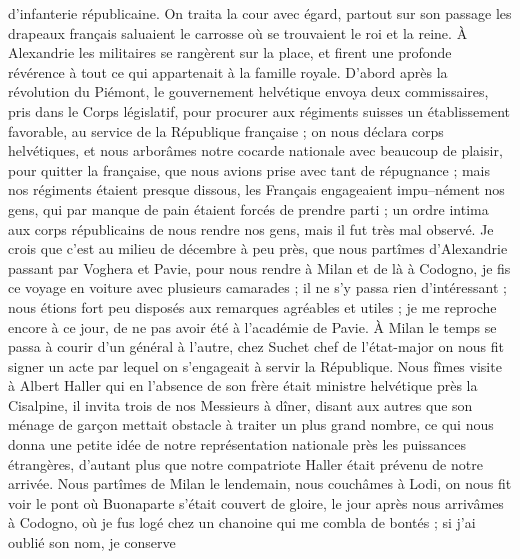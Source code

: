 \documentclass[12pt]{article}
\begin{document}
 d’infanterie républicaine. On traita la cour avec égard,
partout sur son passage les drapeaux français saluaient le carrosse où se trouvaient le roi et la
reine. À Alexandrie les militaires se rangèrent sur la place, et firent une profonde révérence à
tout ce qui appartenait à la famille royale. D’abord après la révolution du Piémont, le gouvernement
helvétique envoya deux commissaires, pris dans le Corps législatif, pour procurer aux régiments
suisses un établissement favorable, au service de la République française ; on nous déclara corps
helvétiques, et nous arborâmes notre cocarde nationale avec beaucoup de plaisir, pour quitter la
française, que nous avions prise avec tant de répugnance ; mais nos régiments étaient presque
dissous, les Français engageaient impu–nément nos gens, qui par manque de pain étaient forcés de
prendre parti ; un ordre intima aux corps républicains de nous rendre nos gens, mais il fut très mal
observé. Je crois que c’est au milieu de décembre à peu près, que nous partîmes d’Alexandrie passant
par Voghera et Pavie, pour nous rendre à Milan et de là à Codogno, je fis ce voyage en voiture avec
plusieurs camarades ; il ne s’y passa rien d’intéressant ; nous étions fort peu disposés aux
remarques agréables et utiles ; je me reproche encore à ce jour, de ne pas avoir été à l’académie de
Pavie. À Milan le temps se passa à courir d’un général à l’autre, chez Suchet chef de l’état-major
on nous fit signer un acte par lequel on s’engageait à servir la République. Nous fîmes visite à
Albert Haller qui en l’absence de son frère était ministre helvétique près la Cisalpine, il invita
trois de nos Messieurs à dîner, disant aux autres que son ménage de garçon mettait obstacle à
traiter un plus grand nombre, ce qui nous donna une petite idée de notre représentation nationale
près les puissances étrangères, d’autant plus que notre compatriote Haller était prévenu de notre
arrivée. Nous partîmes de Milan le lendemain, nous couchâmes à Lodi, on nous fit voir le pont où
Buonaparte s’était couvert de gloire, le jour après nous arrivâmes à Codogno, où je fus logé chez un
chanoine qui me combla de bontés ; si j’ai oublié son nom, je conserve
\end{document}
